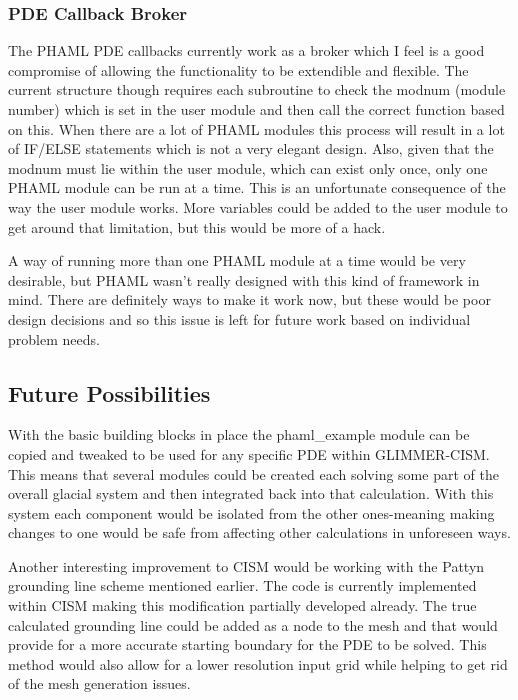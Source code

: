 \subsubsection{PDE Callback Broker}
The PHAML PDE callbacks currently work as a broker which I feel is a good compromise of allowing the functionality to be extendible and flexible.  The current structure though requires each subroutine to check the modnum (module number) which is set in the user module and then call the correct function based on this.  When there are a lot of PHAML modules this process will result in a lot of IF/ELSE statements which is not a very elegant design.  Also, given that the modnum must lie within the user module, which can exist only once, only one PHAML module can be run at a time.  This is an unfortunate consequence of the way the user module works.  More variables could be added to the user module to get around that limitation, but this would be more of a hack.  

A way of running more than one PHAML module at a time would be very desirable, but PHAML wasn't really designed with this kind of framework in mind.  There are definitely ways to make it work now, but these would be poor design decisions and so this issue is left for future work based on individual problem needs.

\subsection{Future Possibilities}\label{sec:chp6poss}

With the basic building blocks in place the phaml\_example module can be copied and tweaked to be used for any specific PDE within GLIMMER-CISM.  This means that several modules could be created each solving some part of the overall glacial system and then integrated back into that calculation.  With this system each component would be isolated from the other ones-meaning making changes to one would be safe from affecting other calculations in unforeseen ways.

Another interesting improvement to CISM would be working with the Pattyn grounding line scheme mentioned earlier.\citep{Pattyn2006JGR}  The code is currently implemented within CISM making this modification partially developed already.  The true calculated grounding line could be added as a node to the mesh and that would provide for a more accurate starting boundary for the PDE to be solved.  This method would also allow for a lower resolution input grid while helping to get rid of the mesh generation issues.


